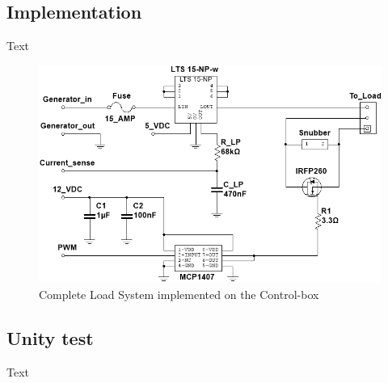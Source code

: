 






\subsection{Implementation}
Text

\begin{figure}[H]
	\centering
	\includegraphics[width=1\linewidth]{Hardware/LoadSystem/LoadSystem}
	\caption{Complete Load System implemented on the Control-box}
	\label{fig:LoadSystemCircuit}
\end{figure}


\subsection{Unity test}
Text